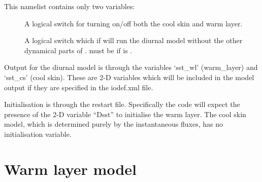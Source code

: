 \documentclass[../main/NEMO_manual]{subfiles}
\begin{document}
\begin{listing}
  \caption{}
  \label{lst:namdiu}
\end{listing}

This namelist contains only two variables:

\begin{description}
\item [{}] A logical switch for turning on/off both the cool skin and warm layer.
\item [{}] A logical switch which if  will run the diurnal model without the other dynamical parts of \NEMO.
   must be  if  is .
\end{description}

Output for the diurnal model is through the variables `sst\_wl' (warm\_layer) and `sst\_cs' (cool skin).
These are 2-D variables which will be included in the model output if they are specified in the iodef.xml file.

Initialisation is through the restart file.
Specifically the code will expect the presence of the 2-D variable ``Dsst'' to initialise the warm layer.
The cool skin model, which is determined purely by the instantaneous fluxes, has no initialisation variable.

\section{Warm layer model}
\label{sec:DIU_warm_layer_sec}
\end{document}
